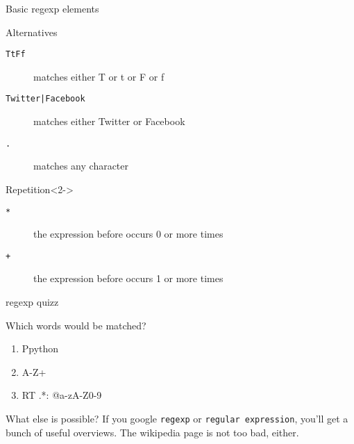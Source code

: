 \documentclass{beamer}
\begin{document}
\begin{frame}{Basic regexp elements}
\begin{block}{Alternatives}
\begin{description}
\item[{\tt{\lbrack TtFf\rbrack}}] matches either T or t or F or f
\item[{\tt{Twitter|Facebook}}] matches either Twitter or Facebook
\item[{\tt{.}}] matches any character
\end{description}
\end{block}
\begin{block}{Repetition}<2->
\begin{description}
\item[{\tt{*}}] the expression before occurs 0 or more times
\item[{\tt{+}}] the expression before occurs 1 or more times
\end{description}
\end{block}
\end{frame}

\begin{frame}{regexp quizz}
\begin{block}{Which words would be matched?}
\tt
\begin{enumerate}
\item<1-> \lbrack Pp\rbrack ython
\item<2-> \lbrack A-Z\rbrack +
\item<3-> RT .*: @\lbrack a-zA-Z0-9\rbrack *
\end{enumerate}
\end{block}
\end{frame}

\begin{frame}{What else is possible?}
If you google {\tt{regexp}} or {\tt{regular expression}}, you'll get a bunch of useful overviews. The wikipedia page is not too bad, either. 
\end{frame}
\end{document}
